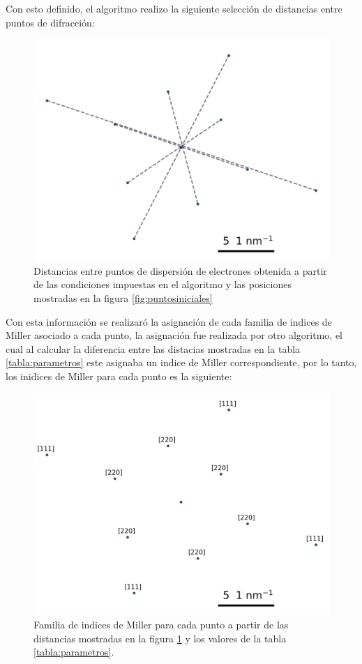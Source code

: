 \documentclass[reprint,amsmath,amssymb,aps,]{revtex4-2}
\begin{document}
Con esto definido, el algoritmo realizo la siguiente selección de distancias entre puntos de difracción:
\begin{figure}[H]
    \centering
    \includegraphics[scale=0.4]{../Graphics/distancia.png}
    \caption{Distancias entre puntos de dispersión de electrones obtenida a partir de las condiciones impuestas en el algoritmo y las posiciones mostradas en la figura  \ref{fig:puntosiniciales}}
    \label{fig:distancias}
\end{figure}
Con esta información se realizaró la asignación de cada familia de indices de Miller asociado a cada punto, la asignación fue realizada por otro algoritmo, el cual al calcular la diferencia entre las distacias mostradas en la tabla
\ref{tabla:parametros} este asignaba un indice de Miller correspondiente, por lo tanto, los inidices de Miller para cada punto es la siguiente:
\begin{figure}[H]
    \includegraphics[scale=0.4]{../Graphics/indices.png}
    \caption{Familia de indices de Miller para cada punto a partir de las distancias mostradas en la figura \ref{fig:distancias} y los valores de la tabla \ref{tabla:parametros}.}
    \label{fig:indices}
\end{figure}
\end{document}
